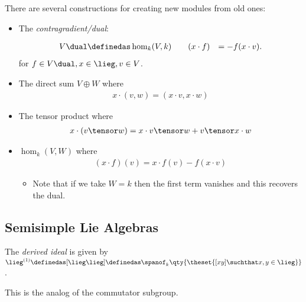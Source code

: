 There are several constructions for creating new modules from old ones:

\begin{itemize}
\item
  The \emph{contragradient/dual}:

  \begin{definition}

  \begin{align*}
  V\dual &\definedas \hom_k(V, k) \qquad
  (x\cdot f) &= -f(x\cdot v)
  .\end{align*} for \(f\in V\dual, x\in \lieg, v\in V\).

  \end{definition}
\item
  The direct sum \(V\oplus W\) where
  \begin{align*}
  x\cdot(v, w) = (x\cdot v, x\cdot w)
  \end{align*}
\item
  The tensor product where
  \begin{align*}
  x\cdot(v\tensor w) = x\cdot v \tensor w + v\tensor x\cdot w
  \end{align*}
\item
  \(\hom_k(V, W)\) where
  \begin{align*}
  (x\cdot f)(v) = x\cdot f(v) - f(x\cdot v)
  \end{align*}

  \begin{itemize}
  \tightlist
  \item
    Note that if we take \(W=k\) then the first term vanishes and this
    recovers the dual.
  \end{itemize}
\end{itemize}

\hypertarget{semisimple-lie-algebras}{%
\subsection{Semisimple Lie Algebras}\label{semisimple-lie-algebras}}

\begin{definition}

The \emph{derived ideal} is given by
\(\lieg^{(1)} \definedas [\lieg \lieg] \definedas \spanof_k\qty{\theset{[x y] \suchthat x,y\in\lieg }}\).

\end{definition}

This is the analog of the commutator subgroup.

